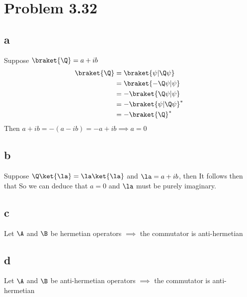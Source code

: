 \section*{Problem 3.32}
\subsection*{a}
Suppose $\braket{\Q} = a+ib$
\begin{equation}
    \begin{split}
        \braket{\Q}
        &=\braket{\psi|\Q\psi} \\
        &= \braket{-\Q\psi|\psi}\\
        &= -\braket{\Q\psi|\psi}\\
        &= -\braket{\psi|\Q\psi}^\ast\\
        &= -\braket{\Q}^\ast
    \end{split}
\end{equation}
Then $a+ib = -(a-ib) = -a + ib\implies a = 0$
\subsection*{b}
Suppose $\Q\ket{\la} = \la\ket{\la}$ and $\la = a+ib$, then
\eq{
\bk{\la|\Q\la} &= \la\\
\bk{\la|\Q\la} &= \bk{-\Q\la|\la}\\
&=-\bk{\Q\la|\la}\\
&=-\bk{\la|\Q\la}^\ast\\
&=-\la^\ast
}
It follows then that
So we can deduce that $a=0$ and $\la$ must be purely imaginary.
\subsection*{c}
Let $\A$ and $\B$ be hermetian operators
\eq{
\bk{\p|[\A,\B]\phi} &= \bk{\p|[\A\B-\B\A]\phi}\\
&=\bk{[\A\B-\B\A]\da\p|\phi}\\
&=\bk{[(\A\B)\da-(\B\A)\da]\p|\phi}\\
&=\bk{[\B\da\A\da-\A\da\B\da]\p|\phi}\\ 
&=\bk{[\B\A-\A\B]\p|\phi}\\
&=\bk{-[\A,\B]\p|\phi}
}
$\implies$ the commutator is anti-hermetian
\subsection*{d}
Let $\A$ and $\B$ be anti-hermetian operators
\eq{
\bk{\p|[\A,\B]\phi} &= \bk{\p|[\A\B-\B\A]\phi}\\
&=\bk{[\A\B-\B\A]\da\p|\phi}\\
&=\bk{[(\A\B)\da-(\B\A)\da]\p|\phi}\\
&=\bk{[\B\da\A\da-\A\da\B\da]\p|\phi}\\ 
&=\bk{[(-\B)(-\A)-(-\A)(-\B)]\p|\phi}\\
&=\bk{-[\A,\B]\p|\phi}
}
$\implies$ the commutator is anti-hermetian

